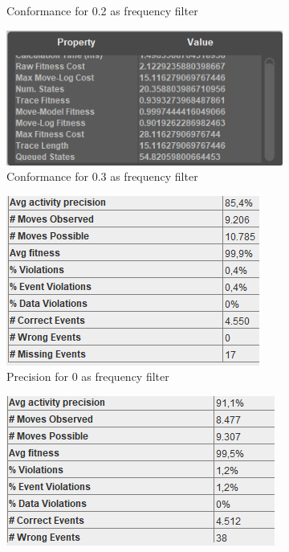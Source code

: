 \begin{figure}[!htbp]
\begin{subfigure}{.24\textwidth}
  \caption{Conformance for 0.2 as frequency filter}
  \label{fig:ApprovCon0-2}
\end{subfigure}%
\begin{subfigure}{.24\textwidth}
  \centering
  \includegraphics[width=\linewidth]{ApprovConf0-3.PNG}
  \caption{Conformance for 0.3 as frequency filter}
  \label{fig:ApprovCon0-3}
\end{subfigure}
\begin{subfigure}{.24\textwidth}
  \centering
  \includegraphics[width=\linewidth]{ApprovPrec0.PNG}
  \caption{Precision for 0 as frequency filter}
  \label{fig:ApprovPrec0-1}
\end{subfigure}%
\begin{subfigure}{.24\textwidth}
  \centering
  \includegraphics[width=\linewidth]{ApprovPrec0-1.PNG}

\end{subfigure}
\end{figure}
